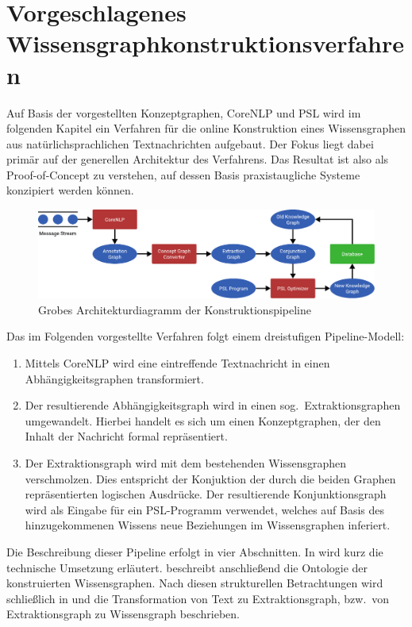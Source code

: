 \chapter{Vorgeschlagenes Wissensgraph\-konstruktions\-verfahren}%
\label{sec:text2kg}

Auf Basis der vorgestellten Konzeptgraphen, CoreNLP und PSL wird im folgenden Kapitel ein Verfahren für die online Konstruktion eines Wissensgraphen aus natürlichsprachlichen Textnachrichten aufgebaut.
Der Fokus liegt dabei primär auf der generellen Architektur des Verfahrens.
Das Resultat ist also als Proof-of-Concept zu verstehen, auf dessen Basis praxistaugliche Systeme konzipiert werden können.

\begin{figure}[h]
	\includegraphics[width=\textwidth]{gfx/text2kg/architecture.pdf}
	\caption{Grobes Architekturdiagramm der Konstruktionspipeline}\label{fig:text2kg:architecture}
\end{figure}
Das im Folgenden vorgestellte Verfahren folgt einem dreistufigen Pipeline-Modell:
\begin{enumerate}
	\item Mittels CoreNLP wird eine eintreffende Textnachricht in einen Abhängigkeitsgraphen transformiert.
	\item Der resultierende Abhängigkeitsgraph wird in einen sog.\ Extraktionsgraphen umgewandelt.
		Hierbei handelt es sich um einen Konzeptgraphen, der den Inhalt der Nachricht formal repräsentiert.
	\item Der Extraktionsgraph wird mit dem bestehenden Wissensgraphen verschmolzen.
		Dies entspricht der Konjuktion der durch die beiden Graphen repräsentierten logischen Ausdrücke.
		Der resultierende Konjunktionsgraph wird als Eingabe für ein PSL-Programm verwendet, welches auf Basis des hinzugekommenen Wissens neue Beziehungen im Wissensgraphen inferiert.
\end{enumerate}
Die Beschreibung dieser Pipeline erfolgt in vier Abschnitten.
In  wird kurz die technische Umsetzung erläutert.
 beschreibt anschließend die Ontologie der konstruierten Wissensgraphen.
Nach diesen strukturellen Betrachtungen wird schließlich in  und  die Transformation von Text zu Extraktionsgraph, bzw.\ von Extraktionsgraph zu Wissensgraph beschrieben.


